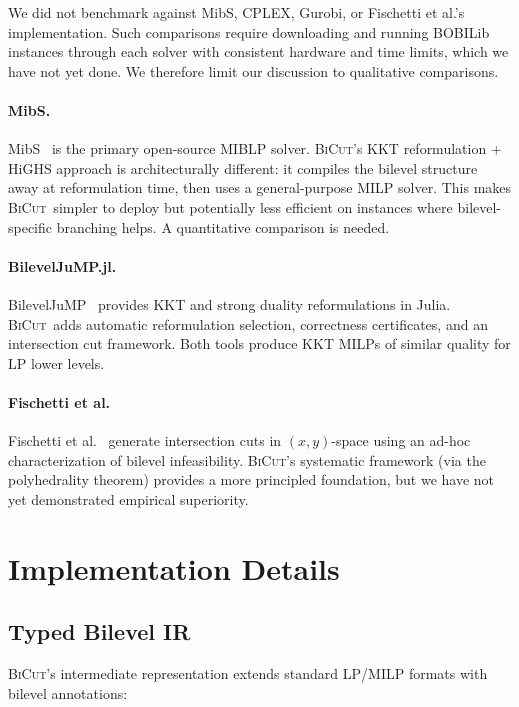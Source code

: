 \documentclass[11pt]{article}
\newcommand{\BiCut}{\textsc{BiCut}}
\begin{document}
We did not benchmark against MibS, CPLEX, Gurobi, or Fischetti et al.'s
implementation. Such comparisons require downloading and running
BOBILib instances through each solver with consistent hardware and
time limits, which we have not yet done. We therefore limit our
discussion to qualitative comparisons.

\paragraph{MibS.}
MibS~\cite{tahernejad2020branch} is the primary open-source MIBLP solver.
\BiCut's KKT reformulation + HiGHS approach is architecturally different:
it compiles the bilevel structure away at reformulation time, then uses
a general-purpose MILP solver. This makes \BiCut\ simpler to deploy but
potentially less efficient on instances where bilevel-specific branching
helps. A quantitative comparison is needed.

\paragraph{BilevelJuMP.jl.}
BilevelJuMP~\cite{diasgarcia2022bilevel} provides KKT and strong duality
reformulations in Julia. \BiCut\ adds automatic reformulation selection,
correctness certificates, and an intersection cut framework. Both tools
produce KKT MILPs of similar quality for LP lower levels.

\paragraph{Fischetti et al.}
Fischetti et al.~\cite{fischetti2017new} generate intersection cuts
in $(x,y)$-space using an ad-hoc characterization of bilevel infeasibility.
\BiCut's systematic framework (via the polyhedrality theorem) provides
a more principled foundation, but we have not yet demonstrated empirical
superiority.

\section{Implementation Details}
\label{sec:implementation}

\subsection{Typed Bilevel IR}

\BiCut's intermediate representation extends standard LP/MILP formats with
bilevel annotations:
\end{document}
